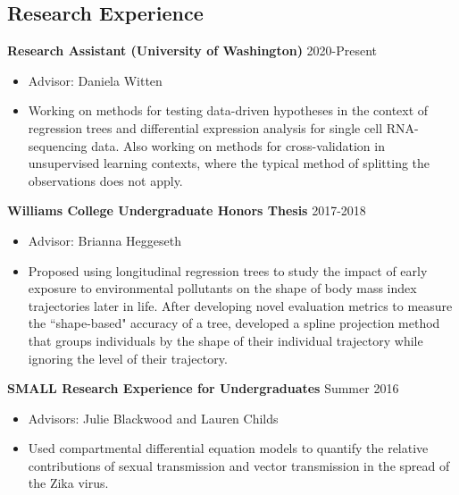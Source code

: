 \documentclass[margin, 10pt]{res} %
\begin{document}
\begin{resume}
 
\section{Research Experience}

{\textbf{Research Assistant (University of Washington)} \hfill 2020-Present
\begin{itemize}
\item Advisor: Daniela Witten
\item Working on methods for testing data-driven hypotheses in the context of regression trees and differential expression analysis for single cell RNA-sequencing data. Also working on methods for cross-validation in unsupervised learning contexts, where the typical method of splitting the observations does not apply.  
\end{itemize} 

{\textbf{Williams College Undergraduate Honors Thesis}} \hfill 2017-2018 
\begin{itemize}
\item Advisor: Brianna Heggeseth
\item Proposed using longitudinal regression trees to study the impact of early exposure to environmental pollutants on the shape of body mass index trajectories later in life. After developing novel evaluation metrics to measure the ``shape-based" accuracy of a tree, developed a spline projection method that groups individuals by the shape of their individual trajectory while ignoring the level of their trajectory. 
\end{itemize} 

{\textbf{SMALL Research Experience for Undergraduates}} \hfill Summer 2016 
\begin{itemize}
\item Advisors: Julie Blackwood and Lauren Childs
\item Used compartmental differential equation models to quantify the relative contributions of sexual transmission and vector transmission in the spread of the Zika virus. 
\end{itemize} 


}
\end{resume}
\end{document}
